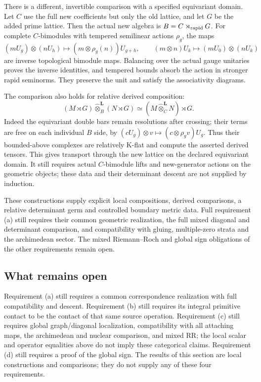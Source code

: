 \documentclass[11pt]{amsart}
\theoremstyle{definition}
\theoremstyle{remark}
\begin{document}
There is a different, invertible comparison with a specified equivariant
domain. Let $C$ use the full new coefficients but only the old lattice,
and let $G$ be the added prime lattice. Then the actual new algebra is
$B=C\rtimes_{\rm rapid}G$. For complete $C$-bimodules with tempered
semilinear actions $\rho_g$, the maps
\[
 (mU_g)\otimes(nU_h)\longmapsto
       (m\otimes\rho_g(n))U_{g+h},\qquad
 (m\otimes n)U_k\longmapsto(mU_0)\otimes(nU_k)
\]
are inverse topological bimodule maps. Balancing over the actual gauge
unitaries proves the inverse identities, and tempered bounds absorb
the action in stronger rapid seminorms. They preserve the unit and
satisfy the associativity diagrams.

The comparison also holds for relative derived composition:
\[
 (M\rtimes G)\widehat\otimes_B^{\mathbf L}(N\rtimes G)
       \simeq (M\widehat\otimes_C^{\mathbf L}N)\rtimes G.
\]
Indeed the equivariant double bars remain resolutions after crossing;
their terms are free on each individual $B$ side, by
$(cU_g)\otimes v\mapsto(c\otimes\rho_gv)U_g$.
Thus their bounded-above complexes are relatively K-flat and compute
the asserted derived tensors. This gives transport through the new
lattice on the declared equivariant domain. It still requires actual
$C$-bimodule lifts and new-generator actions on the geometric objects;
these data and their determinant descent are not supplied by induction.

These constructions supply explicit local compositions, derived comparisons,
a relative determinant germ and controlled boundary metric data. Full
requirement (a) still requires their common geometric realization, the full mixed
diagonal and determinant comparison, and compatibility
with gluing, multiple-zero strata and the archimedean sector. The mixed
Riemann--Roch and global sign obligations of the other requirements remain open.


\subsection{What remains open}\label{ss:abcdopen}
Requirement (a) still requires a common correspondence realization with
full compatibility and descent. Requirement (b) still requires its
integral primitive contact to be the contact of that same source operation.
Requirement (c) still requires global graph/diagonal localization, compatibility
with all attaching maps, the archimedean and nuclear comparison, and mixed
RR; the local scalar and operator equalities above do not imply these
categorical claims. Requirement (d) still requires a proof of the global
sign. The results of this section are local constructions and
comparisons; they do not supply any of these four requirements.
\end{document}

